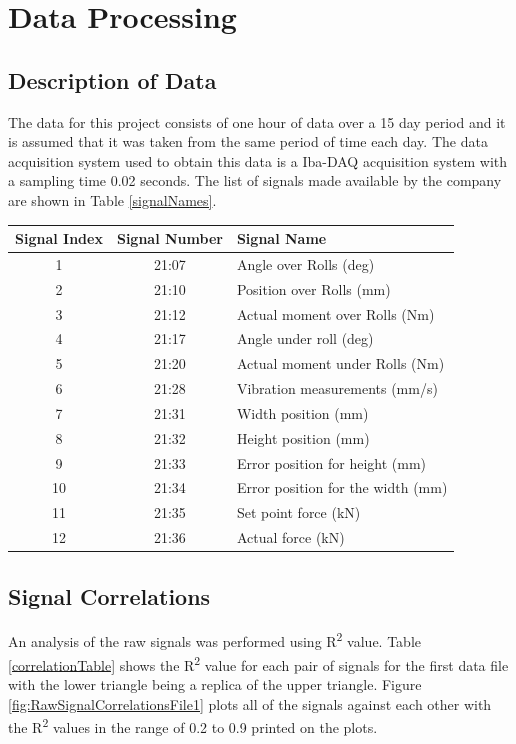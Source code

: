 \documentclass[]{article}
\begin{document}
\section{Data Processing}
\subsection{Description of Data}
The data for this project consists of one hour of data over a 15 day period and it is assumed that it was taken from the same period of time each day. The data acquisition system used to obtain this data is a Iba-DAQ acquisition system with a sampling time 0.02 seconds. The list of signals made available by the company are shown in Table \ref{signalNames}.
\begin{center}
\label{signalNames}
\begin{tabular}{ |c|c|l| }
 \hline
Signal Index & Signal Number & Signal Name \\ 
 \hline
1 & 21:07 & Angle over Rolls (deg) \\
 \hline
2 & 21:10 & Position over Rolls (mm) \\
 \hline
3 & 21:12 & Actual moment over Rolls (Nm) \\
 \hline
4 & 21:17 & Angle under roll (deg) \\
 \hline
5 & 21:20 & Actual moment under Rolls (Nm) \\
 \hline
6 & 21:28 & Vibration measurements (mm/s) \\ 
 \hline              
7 & 21:31 & Width position (mm) \\
 \hline
8 & 21:32 & Height position (mm) \\
 \hline
9 & 21:33 & Error position for height (mm) \\
 \hline
10 & 21:34 & Error position for the width (mm) \\
 \hline
11 & 21:35 & Set point force (kN) \\
 \hline
12 & 21:36 & Actual force (kN) \\
 \hline
\end{tabular}
\end{center}

\subsection{Signal Correlations}
An analysis of the raw signals was performed using R\textsuperscript{2} value. Table \ref{correlationTable} shows the R\textsuperscript{2} value for each pair of signals for the first data file with the lower triangle being a replica of the upper triangle. Figure \ref{fig:RawSignalCorrelationsFile1} plots all of the signals against each other with the R\textsuperscript{2} values in the range of 0.2 to 0.9 printed on the plots. 
\end{document}

